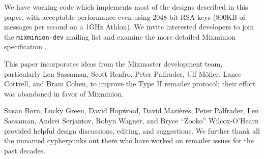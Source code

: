 \documentclass[times,10pt,twocolumn]{article}
\begin{document}
We have working code which implements most of the designs described in this
paper, with acceptable performance even using 2048 bit RSA keys
(800KB of messages per second on a 1GHz Athlon).
We invite interested developers to
join the {\tt mixminion-dev} mailing list and examine the more detailed
Mixminion specification \cite{mixminion-spec}.



This paper incorporates ideas from the Mixmaster development team,
particularly Len Sassaman, Scott Renfro, Peter Palfrader, Ulf M\"oller,
Lance Cottrell, and Bram Cohen, to improve the Type II remailer protocol;
their effort was abandoned in favor of Mixminion.

Susan Born, Lucky Green, David Hopwood, David Mazi\`{e}res, Peter Palfrader,
Len Sassaman, Andrei Serjantov, Robyn Wagner, and Bryce ``Zooko'' Wilcox-O'Hearn
provided helpful design discussions, editing, and suggestions. We further
thank all the unnamed cypherpunks out there who have worked on remailer
issues for the past decades.




\end{document}
